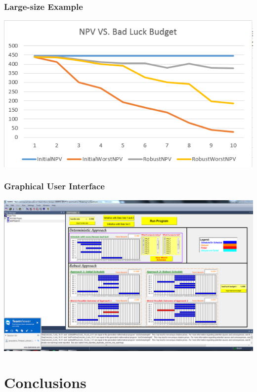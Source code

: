\documentclass{beamer}
\begin{document}
\begin{frame}
\frametitle{Large-size Example}
\begin{center}
\includegraphics[scale=0.45] {last.png} 
\end{center}
\end{frame}
		
		\begin{frame}
			\frametitle{Graphical User Interface}
			\begin{center}
				\includegraphics[trim=112mm 40mm 7mm 26mm,clip,scale=0.35]{../MOPTA2015Report/Data1hp990w1p400.png}
			\end{center}
		\end{frame}

	\section{Conclusions}
\end{document}

